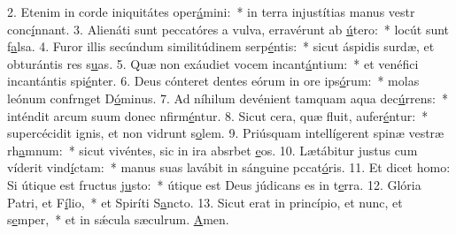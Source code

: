 2. Etenim in corde iniquitátes oper\uline{á}mini:~* in terra injustítias manus vestr conc\uline{í}nnant.
3. Alienáti sunt peccatóres a vulva, erravérunt ab \uline{ú}tero:~* locút sunt f\uline{a}lsa.
4. Furor illis secúndum similitúdinem serp\uline{é}ntis:~* sicut áspidis surdæ, et obturántis res s\uline{u}as.
5. Quæ non exáudiet vocem incant\uline{á}ntium:~* et venéfici incantántis spi\uline{é}nter.
6. Deus cónteret dentes eórum in ore ips\uline{ó}rum:~* molas leónum confrnget D\uline{ó}minus.
7. Ad níhilum devénient tamquam aqua dec\uline{ú}rrens:~* inténdit arcum suum donec nfirm\uline{é}ntur.
8. Sicut cera, quæ fluit, aufer\uline{é}ntur:~* supercécidit ignis, et non vidrunt s\uline{o}lem.
9. Priúsquam intellígerent spinæ vestræ rh\uline{a}mnum:~* sicut vivéntes, sic in ira absrbet \uline{e}os.
10. Lætábitur justus cum víderit vind\uline{í}ctam:~* manus suas lavábit in sánguine pccat\uline{ó}ris.
11. Et dicet homo: Si útique est fructus j\uline{u}sto:~* útique est Deus júdicans es in t\uline{e}rra.
12. Glória Patri, et F\uline{í}lio,~* et Spiríti S\uline{a}ncto.
13. Sicut erat in princípio, et nunc, et s\uline{e}mper,~* et in sǽcula sæculrum. \uline{A}men.
